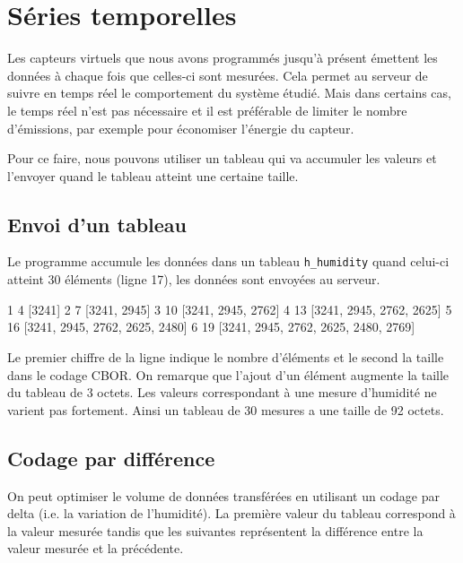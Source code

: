 \chapter{Séries temporelles}

\begin{figure}
\end{figure}

Les capteurs virtuels que nous avons programmés jusqu’à présent émettent les données à chaque fois que celles-ci sont mesurées. 
Cela permet au serveur de suivre en temps réel le comportement du système étudié. 
Mais dans certains cas, le temps réel n’est pas nécessaire et il est préférable de limiter le nombre d’émissions, par exemple pour économiser l'énergie du capteur.

Pour ce faire, nous pouvons utiliser un tableau qui va accumuler les valeurs et l’envoyer quand le tableau atteint une certaine taille.


\section{Envoi d'un tableau}

Le programme  accumule les données dans un tableau \texttt{h\_humidity} quand celui-ci atteint 30 éléments (ligne 17), les données sont envoyées au serveur.




\begin{termc}[backgroundcolor=\color{palerod}, basicstyle=\ttfamily\small, escapechar=\#]
1 4 [3241]
2 7 [3241, 2945]
3 10 [3241, 2945, 2762]
4 13 [3241, 2945, 2762, 2625]
5 16 [3241, 2945, 2762, 2625, 2480]
6 19 [3241, 2945, 2762, 2625, 2480, 2769]
\end{termc}

Le premier chiffre de la ligne indique le nombre d'éléments et le second la taille dans le codage CBOR. On remarque que l'ajout d'un élément augmente la taille du tableau de 3 octets. Les valeurs correspondant à une mesure d'humidité ne varient pas fortement. Ainsi un tableau de 30 mesures a une taille de 92 octets.

\section{Codage par différence}

On peut optimiser le volume de données transférées en utilisant un codage par delta (i.e. la variation de l'humidité). 
La première valeur du tableau correspond à la valeur mesurée tandis que les suivantes représentent la différence entre la valeur mesurée et la précédente.

